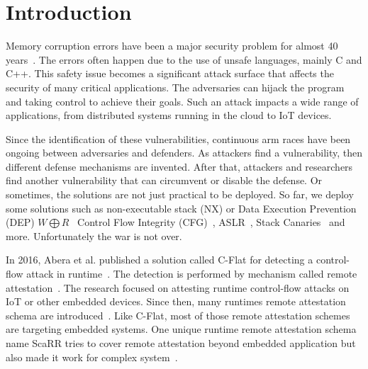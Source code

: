 
\chapter{Introduction} %

\label{Chapter1} %

Memory corruption errors have been a major security problem for almost 40
years~\cite{szekeresSoKEternalWar2013,vanderveenMemoryErrorsPresent2012}. The
errors often happen due to the use of unsafe languages, mainly C and C++. This
safety issue becomes a significant attack surface that affects the security of
many critical applications. The adversaries can hijack the program and taking
control to achieve their goals. Such an attack impacts a wide range of
applications, from distributed systems running in the cloud to IoT devices. 

Since the identification of these vulnerabilities, continuous arm races have
been ongoing between adversaries and defenders. As attackers find a
vulnerability, then different defense mechanisms are invented. After that,
attackers and researchers find another vulnerability that can circumvent or
disable the defense. Or sometimes, the solutions are not just practical to be
deployed. So far, we deploy some solutions such as non-executable stack (NX) or
Data Execution Prevention (DEP)  \( W \bigoplus R
\)~\cite{vanderveenMemoryErrorsPresent2012} Control Flow Integrity
(CFG)~\cite{abadiControlFlowIntegrityPrinciples2005},
ASLR~\cite{kilAddressSpaceLayout2006}, Stack
Canaries~\cite{baratlooTransparentRunTimeDefense2000} and more. Unfortunately
the war is not over.

In 2016, Abera et al. published a solution called C-Flat for detecting a
control-flow attack in runtime~\cite{aberaCFLATControlFlowAttestation2016}. The
detection is performed by mechanism called remote
attestation~\cite{haldarSemanticRemoteAttestationA2004}. The research focused on
attesting runtime control-flow attacks on IoT or other embedded devices. Since
then, many runtimes remote attestation schema are
introduced~\cite{dessoukyLOFATLowOverheadControl2017,
zeitouniATRIUMRuntimeAttestation2017, kohnhauserSCAPIScalableAttestation2017,
dessoukyLiteHAXLightweightHardwareassisted2018, aberaDIATDataIntegrity2019,
koutroumpouchosSecureEdgeComputing2019, sunOATAttestingOperation2020}. Like
C-Flat, most of those remote attestation schemes are targeting embedded systems.
One unique runtime remote attestation schema name ScaRR tries to cover remote
attestation beyond embedded application but also made it work for complex
system~\cite{toffaliniScaRRScalableRuntime2019}. 

